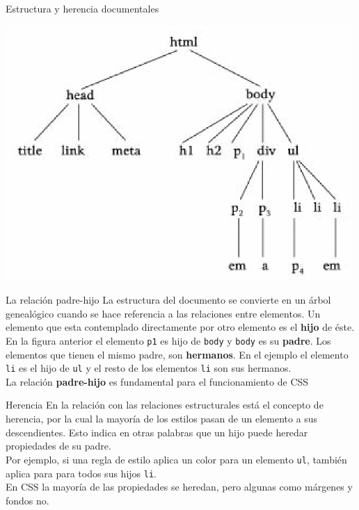 \begin{frame}{Estructura y herencia documentales} %
    \begin{center}
    \includegraphics[scale=0.5]{imgs/htmlestructura.png}
    \end{center}
\end{frame}

\begin{frame}{La relación padre-hijo} %
    La estructura del documento se convierte en un árbol genealógico cuando se
    hace referencia a las relaciones entre elementos. Un elemento que esta
    contemplado directamente por otro elemento es el \textbf{hijo} de éste. En
    la figura anterior el elemento \texttt{p1} es hijo de \texttt{body} y
    \texttt{body} es su \textbf{padre}. Los elementos que tienen el mismo
    padre, son \textbf{hermanos}. En el ejemplo el elemento \texttt{li} es el
    hijo de \texttt{ul} y el resto de los elementos \texttt{li} son sus
    hermanos. \\[0.5cm]

    La relación \textbf{padre-hijo} es fundamental para el funcionamiento de
    CSS
\end{frame}


\begin{frame}{Herencia} %
    En la relación con las relaciones estructurales está el concepto de
    herencia, por la cual la mayoría de los estilos pasan de un elemento a sus
    descendientes. Esto indica en otras palabras que un hijo puede heredar
    propiedades de su padre. \\[0.5cm]

    Por ejemplo, si una regla de estilo aplica un color para un elemento
    \texttt{ul}, también aplica para para todos sus hijos \texttt{li}. \\[0.5cm]

    En CSS la mayoría de las propiedades se heredan, pero algunas como
    márgenes y fondos no. 
\end{frame}


